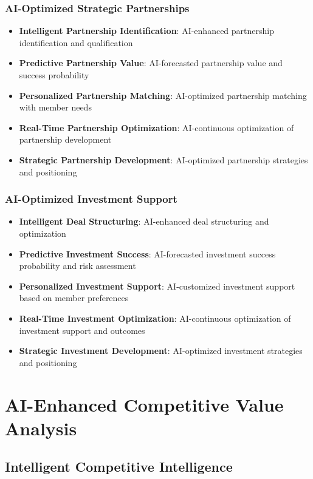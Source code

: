 \subsubsection{AI-Optimized Strategic Partnerships}

\begin{itemize}
    \item \textbf{Intelligent Partnership Identification}: AI-enhanced partnership identification and qualification
    \item \textbf{Predictive Partnership Value}: AI-forecasted partnership value and success probability
    \item \textbf{Personalized Partnership Matching}: AI-optimized partnership matching with member needs
    \item \textbf{Real-Time Partnership Optimization}: AI-continuous optimization of partnership development
    \item \textbf{Strategic Partnership Development}: AI-optimized partnership strategies and positioning
\end{itemize}

\subsubsection{AI-Optimized Investment Support}

\begin{itemize}
    \item \textbf{Intelligent Deal Structuring}: AI-enhanced deal structuring and optimization
    \item \textbf{Predictive Investment Success}: AI-forecasted investment success probability and risk assessment
    \item \textbf{Personalized Investment Support}: AI-customized investment support based on member preferences
    \item \textbf{Real-Time Investment Optimization}: AI-continuous optimization of investment support and outcomes
    \item \textbf{Strategic Investment Development}: AI-optimized investment strategies and positioning
\end{itemize}

\section{AI-Enhanced Competitive Value Analysis}

\subsection{Intelligent Competitive Intelligence}

